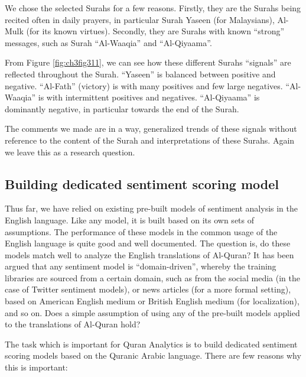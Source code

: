 \documentclass[
]{article}
\begin{document}
We chose the selected Surahs for a few reasons. Firstly, they are the Surahs being recited often in daily prayers, in particular Surah Yaseen (for Malaysians), Al-Mulk (for its known virtues). Secondly, they are Surahs with known ``strong'' messages, such as Surah ``Al-Waaqia'' and ``Al-Qiyaama''.

From Figure \ref{fig:ch3fig311}, we can see how these different Surahs ``signals'' are reflected throughout the Surah. ``Yaseen'' is balanced between positive and negative. ``Al-Fath'' (victory) is with many positives and few large negatives. ``Al-Waaqia'' is with intermittent positives and negatives. ``Al-Qiyaama'' is dominantly negative, in particular towards the end of the Surah.

The comments we made are in a way, generalized trends of these signals without reference to the content of the Surah and interpretations of these Surahs. Again we leave this as a research question.

\hypertarget{building-dedicated-sentiment-scoring-model}{%
\subsection{Building dedicated sentiment scoring model}\label{building-dedicated-sentiment-scoring-model}}

Thus far, we have relied on existing pre-built models of sentiment analysis in the English language. Like any model, it is built based on its own sets of assumptions. The performance of these models in the common usage of the English language is quite good and well documented. The question is, do these models match well to analyze the English translations of Al-Quran? It has been argued that any sentiment model is ``domain-driven'', whereby the training libraries are sourced from a certain domain, such as from the social media (in the case of Twitter sentiment models), or news articles (for a more formal setting), based on American English medium or British English medium (for localization), and so on. Does a simple assumption of using any of the pre-built models applied to the translations of Al-Quran hold?

The task which is important for Quran Analytics is to build dedicated sentiment scoring models based on the Quranic Arabic language. There are few reasons why this is important:
\end{document}
